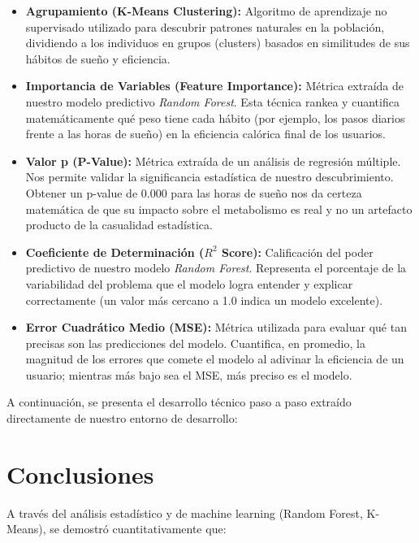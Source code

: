 \documentclass{article}
\begin{document}
\begin{itemize}
    \item \textbf{Agrupamiento (K-Means Clustering):} Algoritmo de aprendizaje no supervisado utilizado para descubrir patrones naturales en la población, dividiendo a los individuos en grupos (clusters) basados en similitudes de sus hábitos de sueño y eficiencia.
    \item \textbf{Importancia de Variables (Feature Importance):} Métrica extraída de nuestro modelo predictivo \textit{Random Forest}. Esta técnica rankea y cuantifica matemáticamente qué peso tiene cada hábito (por ejemplo, los pasos diarios frente a las horas de sueño) en la eficiencia calórica final de los usuarios.
    \item \textbf{Valor p (P-Value):} Métrica extraída de un análisis de regresión múltiple. Nos permite validar la significancia estadística de nuestro descubrimiento. Obtener un p-value de $0.000$ para las horas de sueño nos da certeza matemática de que su impacto sobre el metabolismo es real y no un artefacto producto de la casualidad estadística.
    \item \textbf{Coeficiente de Determinación ($R^2$ Score):} Calificación del poder predictivo de nuestro modelo \textit{Random Forest}. Representa el porcentaje de la variabilidad del problema que el modelo logra entender y explicar correctamente (un valor más cercano a 1.0 indica un modelo excelente).
    \item \textbf{Error Cuadrático Medio (MSE):} Métrica utilizada para evaluar qué tan precisas son las predicciones del modelo. Cuantifica, en promedio, la magnitud de los errores que comete el modelo al adivinar la eficiencia de un usuario; mientras más bajo sea el MSE, más preciso es el modelo.
\end{itemize}

A continuación, se presenta el desarrollo técnico paso a paso extraído directamente de nuestro entorno de desarrollo:

\begingroup


\endgroup

\section{Conclusiones}
A través del análisis estadístico y de machine learning (Random Forest,
K-Means), se demostró cuantitativamente que:
\end{document}
